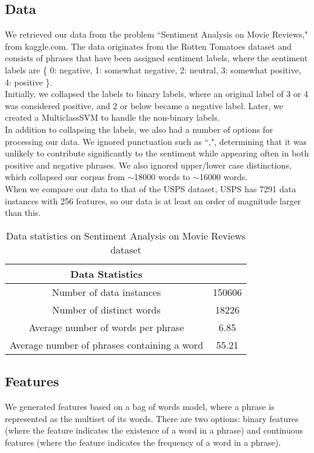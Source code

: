 \documentclass[letterpaper, 11pt]{article}
\begin{document}
\subsection{Data}
We retrieved our data from the problem ``Sentiment Analysis on Movie Reviews," from kaggle.com.  The data originates from the Rotten Tomatoes dataset and consists of phrases that have been assigned sentiment labels, where the sentiment labels are \{ 0: negative, 1: somewhat negative, 2: neutral, 3: somewhat positive, 4: positive \}.\\
\indent Initially, we collapsed the labels to binary labels, where an original label of 3 or 4 was considered positive, and 2 or below became a negative label.  Later, we created a MulticlassSVM to handle the non-binary labels.  \\
\indent In addition to collapsing the labels, we also had a number of options for processing our data.  We ignored punctuation such as  ``,", determining that it was unlikely to contribute significantly to the sentiment while appearing often in both positive and negative phrases.  We also ignored upper/lower case distinctions, which collapsed our corpus from $\sim$18000 words to $\sim$16000 words.\\
\indent When we compare our data to that of the USPS dataset, USPS has 7291 data instances with 256 features, so our data is at least an order of magnitude larger than this.
\begin{table}
\centering
\label{stats}
\begin{tabular}{cc}
\textbf{Data Statistics}&\\
\hline
Number of data instances & 150606\\
Number of distinct words & 18226\\
Average number of words per phrase & 6.85\\
Average number of phrases containing a word & 55.21
\end{tabular}
\caption{Data statistics on Sentiment Analysis on Movie Reviews dataset}
\end{table}


\subsection{Features}
We generated features based on a bag of words model, where a phrase is represented as the multiset of its words.  There are two options: binary features (where the feature indicates the existence of a word in a phrase) and continuous features (where the feature indicates the frequency of a word in a phrase).
\end{document}
